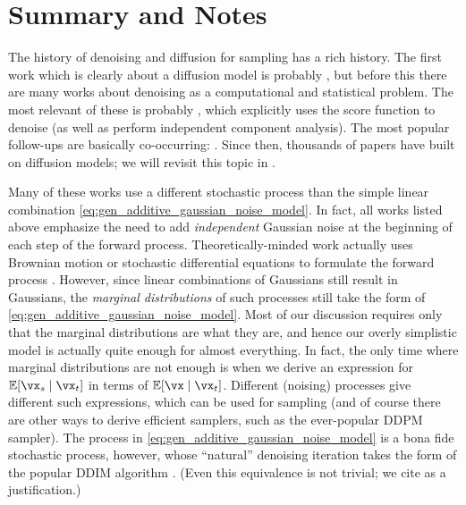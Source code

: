 \documentclass[../../book-main.tex]{subfiles}
\begin{document}

\section{Summary and Notes}

The history of denoising and diffusion for sampling has a rich history. The first work which is clearly about a diffusion model is probably \cite{Sohl-Dickstein2015}, but before this there are many works about denoising as a computational and statistical problem. The most relevant of these is probably \cite{hyvarinen05a}, which explicitly uses the score function to denoise (as well as perform independent component analysis). The most popular follow-ups are basically co-occurring: \cite{ho2020denoising,song2019}. Since then, thousands of papers have built on diffusion models; we will revisit this topic in .

Many of these works use a different stochastic process than the simple linear combination \eqref{eq:gen_additive_gaussian_noise_model}. In fact, all works listed above emphasize the need to add \textit{independent} Gaussian noise at the beginning of each step of the forward process. Theoretically-minded work actually uses Brownian motion or stochastic differential equations to formulate the forward process \cite{song2020score}. However, since linear combinations of Gaussians still result in Gaussians, the \textit{marginal distributions} of such processes still take the form of \eqref{eq:gen_additive_gaussian_noise_model}. Most of our discussion requires only that the marginal distributions are what they are, and hence our overly simplistic model is actually quite enough for almost everything. In fact, the only time where marginal distributions are not enough is when we derive an expression for \(\Ex[\vx_{s} \mid \vx_{t}]\) in terms of \(\Ex[\vx \mid \vx_{t}]\). Different (noising) processes give different such expressions, which can be used for sampling (and of course there are other ways to derive efficient samplers, such as the ever-popular DDPM sampler). The process in \eqref{eq:gen_additive_gaussian_noise_model} is a bona fide stochastic process, however, whose ``natural'' denoising iteration takes the form of the popular DDIM algorithm \cite{song2020denoising}. (Even this equivalence is not trivial; we cite \cite{de2025distributional} as a justification.) 
\end{document}
